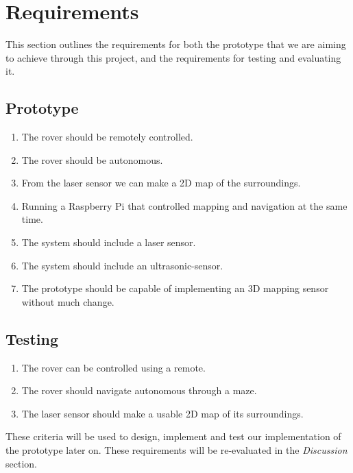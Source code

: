 \section{Requirements}

This section outlines the requirements for both the prototype that we are aiming to achieve through this project, and the requirements for testing and evaluating it.

\subsection{Prototype}

\begin{enumerate}
	
	\item The rover should be remotely controlled.
	\item The rover should be autonomous.
	\item From the laser sensor we can make a 2D map of the surroundings.
	\item Running a Raspberry Pi that controlled mapping and navigation at the same time.
	\item The system should include a laser sensor.
	\item The system should include an ultrasonic-sensor.
 	\item The prototype should be capable of implementing an 3D mapping sensor without much change.
	
\end{enumerate}

\subsection{Testing}

\begin{enumerate}
	
	\item The rover can be controlled using a remote.
	\item The rover should navigate autonomous through a maze.
	\item The laser sensor should make a usable 2D map of its surroundings.
	
\end{enumerate}

These criteria will be used to design, implement and test our implementation of the prototype later on. These requirements will be re-evaluated in the \textit{Discussion} section.
